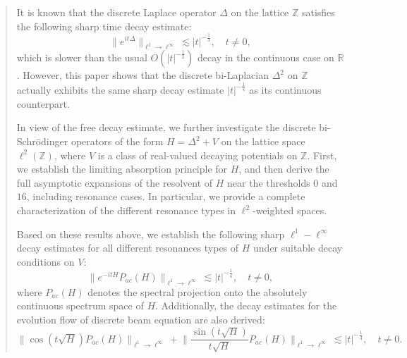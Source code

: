 \documentclass[10pt,a4paper]{amsart}
\newcommand\Z{\mathbb{Z}}
\numberwithin{equation}{section}
\begin{document}
\begin{abstract}
It is known that the discrete Laplace operator $\Delta$ on the lattice $\mathbb{Z}$ satisfies the following sharp time decay estimate:
$$\big\|e^{it\Delta}\big\|_{\ell^1\rightarrow\ell^{\infty}}\lesssim|t|^{-\frac{1}{3}},\quad t\neq0,$$
which is slower than the usual $ O(|t|^{-\frac{1}{2}})$ decay in the continuous case on $\mathbb{R}$. However, this paper shows that the discrete bi-Laplacian $\Delta^2$ on $\mathbb{Z}$ actually exhibits the same sharp decay estimate $|t|^{-\frac{1}{4}}$ as its continuous counterpart.

In view of the free decay estimate, we further investigate the discrete bi-Schr\"{o}dinger operators of the form $H=\Delta^2+V$ on the lattice space $\ell^2(\mathbb{Z})$, where $V$ is a class of real-valued decaying potentials on $\Z$. %
First, we establish the limiting absorption principle for $H$, and then derive the full asymptotic expansions of the resolvent of $H$ near the thresholds $0$ and $16$, including resonance cases. In particular, we provide a complete characterization of the different resonance types in $\ell^2$-weighted spaces. 

Based on these results above, we establish the following sharp $\ell^1-\ell^{\infty}$ decay estimates for all different resonances types of $H$ under suitable decay conditions on $V$:
$$\big\|e^{-itH}P_{ac}(H)\big\|_{\ell^1\rightarrow\ell^{\infty}}\lesssim|t|^{-\frac{1}{4}},\quad t\neq0,$$
where $P_{ac}(H)$ denotes the spectral projection onto the absolutely continuous spectrum space of $H$. 
Additionally, the  decay estimates for the evolution flow of discrete beam equation are also derived:
$$\|{\cos}(t\sqrt H)P_{ac}(H)\|_{\ell^1\rightarrow\ell^{\infty}}+\Big\|\frac{{\sin}(t\sqrt H)}{t\sqrt H}P_{ac}(H)\Big\|_{\ell^1\rightarrow\ell^{\infty}}\lesssim|t|^{-\frac{1}{3}},\quad t\neq0.$$
\end{abstract}
\end{document}
